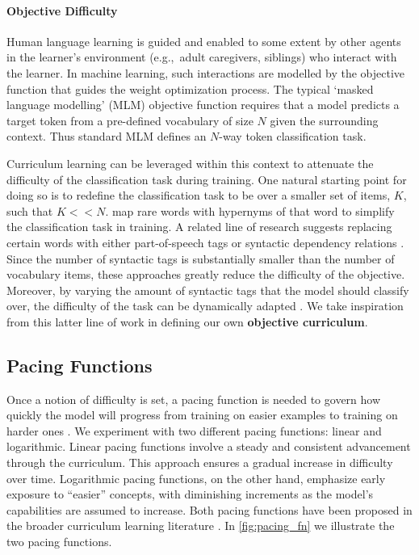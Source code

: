 \paragraph{Objective Difficulty} Human language learning is guided and enabled to some extent by other agents in the learner's environment (e.g.,\ adult caregivers, siblings) who interact with the learner. In machine learning, such interactions are modelled by the objective function that guides the weight optimization process. The typical `masked language modelling' (MLM) objective function requires that a model predicts a target token from a pre-defined vocabulary of size $N$ given the surrounding context. Thus standard MLM defines an $N$-way token classification task.

Curriculum learning can be leveraged within this context to attenuate the difficulty of the classification task during training. One natural starting point for doing so is to redefine the classification task to be over a smaller set of items, $K$, such that $ K << N$. \citet{bai2022better} map rare words with hypernyms of that word to simplify the classification task in training. A related line of research suggests replacing certain words with either part-of-speech tags \cite{wang2023language} or syntactic dependency relations \cite{cui2022lert}. Since the number of syntactic tags is substantially smaller than the number of vocabulary items, these approaches greatly reduce the difficulty of the objective. Moreover, by varying the amount of syntactic tags that the model should classify over, the difficulty of the task can be dynamically adapted \cite{wang2023language}. We take inspiration from this latter line of work in defining our own \textbf{objective curriculum}. 

\subsection{Pacing Functions} Once a notion of difficulty is set, a pacing function is needed to govern how quickly the model will progress from training on easier examples to training on harder ones \cite{wu2021when}. We experiment with two different pacing functions: linear and logarithmic. Linear pacing functions involve a steady and consistent advancement through the curriculum. This approach ensures a gradual increase in difficulty over time. Logarithmic pacing functions, on the other hand, emphasize early exposure to ``easier'' concepts, with diminishing increments as the model's capabilities are assumed to increase. Both pacing functions have been proposed in the broader curriculum learning literature \citep{bai2022better, li2021curriculum, wu2021when}. In \cref{fig:pacing_fn} we illustrate the two pacing functions.


